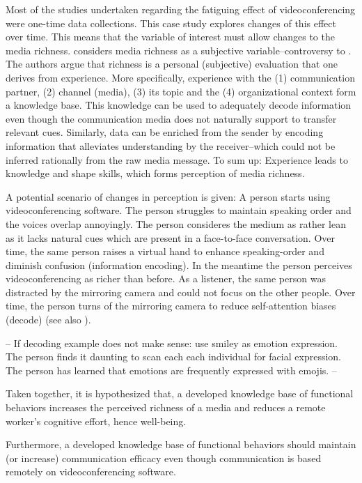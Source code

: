 \documentclass[man]{apa7}
\begin{document}
Most of the studies undertaken regarding the fatiguing effect of videoconferencing were one-time data collections. This case study explores changes of this effect over time. This means that the variable of interest must allow changes to the media richness. \cite{Carlson1999} considers media richness as a subjective variable–controversy to \citeauthor{daft1983information}. The authors argue that richness is a personal (subjective) evaluation that one derives from experience. More specifically, experience with the (1) communication partner, (2) channel (media), (3) its topic and the (4) organizational context form a knowledge base. This knowledge can be used to adequately decode information even though the communication media does not naturally support to transfer relevant cues. Similarly, data can be enriched from the sender by encoding information that alleviates understanding by the receiver–which could not be inferred rationally from the raw media message. To sum up: Experience leads to knowledge and shape skills, which forms perception of media richness.

A potential scenario of changes in perception is given: A person starts using videoconferencing software. The person struggles to maintain speaking order and the voices overlap annoyingly. The person consideres the medium as rather lean as it lacks natural cues which are present in a face-to-face conversation. Over time, the same person raises a virtual hand to enhance speaking-order and diminish confusion (information encoding). In the meantime the person perceives videoconferencing as richer than before. As a listener, the same person was distracted by the mirroring camera and could not focus on the other people. Over time, the person turns of the mirroring camera to reduce self-attention biases (decode) (see also \cite{Riedl2021}).

--
If decoding example does not make sense: use smiley as emotion expression. The person finds it daunting to scan each each individual for facial expression. The person has learned that emotions are frequently expressed with emojis.
--

Taken together, it is hypothesized that, a developed knowledge base of functional behaviors increases the perceived richness of a media and reduces a remote worker's cognitive effort, hence well-being.

Furthermore, a developed knowledge base of functional behaviors should maintain (or increase) communication efficacy even though communication is based remotely on videoconferencing software.
\end{document}
